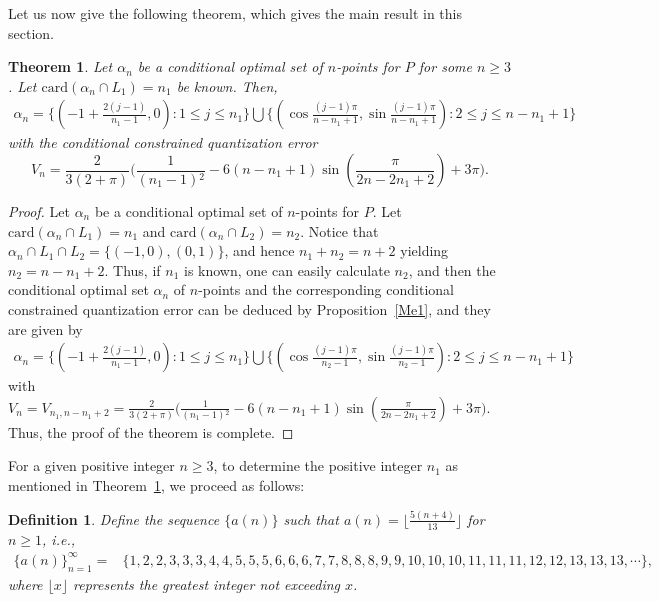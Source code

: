 \documentclass[12pt, reqno]{amsart}
\theoremstyle{plain}
\newtheorem{theo}[subsection]{Theorem}
\newtheorem{defi}[subsection]{Definition}
\theoremstyle{definition}
\newcommand{\ii}{\cap}%
\newcommand{\UU}{\bigcup}%
\newcommand{\set}[1]{\{#1\}}%
\newcommand{\ga}{\alpha}
\newcommand{\te}{\text}%
\begin{document}
Let us now give the following theorem, which gives the main result in this section. 
\begin{theo}\label{theo1}
Let $\ga_n$ be a conditional optimal set of $n$-points for $P$ for some $n\geq 3$. Let $\te{card}(\ga_n\ii L_1)=n_1$ be known. Then, 
\begin{align*}
\ga_n=\set{(-1+\frac{2(j-1)}{n_1-1}, 0) : 1\leq j\leq n_1}\UU \set{(\cos \frac{(j-1)\pi}{n-n_1+1}, \sin\frac {(j-1)\pi}{n-n_1+1}) : 2\leq j\leq n-n_1+1} 
\end{align*}
with the conditional constrained quantization error 
\[V_n=\frac{2}{3 (2+\pi )} \Big(\frac{1}{(n_1-1){}^2}-6 (n-n_1+1) \sin (\frac{\pi }{2 n-2 n_1+2})+3 \pi \Big).\]
 \end{theo}
\begin{proof}
Let $\ga_n$ be a conditional optimal set of $n$-points for $P$. Let $\te{card}(\ga_n\ii L_1)=n_1$  and $\te{card}(\ga_n\ii L_2)=n_2$. Notice that $\ga_n\ii L_1\ii L_2=\set{(-1, 0), (0, 1)}$, and hence $n_1+n_2=n+2$ yielding $n_2=n-n_1+2$. Thus, if $n_1$ is known, one can easily calculate $n_2$, and then the conditional optimal set $\ga_n$ of $n$-points and the corresponding conditional constrained quantization error can be deduced by Proposition~\ref{Me1}, and they are given by 
\begin{align*}
\ga_n=\set{(-1+\frac{2(j-1)}{n_1-1}, 0) : 1\leq j\leq n_1}\UU \set{(\cos \frac{(j-1)\pi}{n_2-1}, \sin\frac {(j-1)\pi}{n_2-1}) : 2\leq j\leq n-n_1+1} 
\end{align*} 
with $V_n=V_{n_1, n-n_1+2}=\frac{2}{3 (2+\pi )}\Big(\frac{1}{(n_1-1){}^2}-6 (n-n_1+1) \sin (\frac{\pi }{2 n-2 n_1+2})+3 \pi \Big)$.
Thus, the proof of the theorem is complete. 
\end{proof}

For a given positive integer $n\geq 3$, to determine the positive integer $n_1$ as mentioned in Theorem~\ref{theo1}, we proceed as follows: 
 
\begin{defi} \label{difi21}
Define the sequence $\set{a(n)}$ such that $a(n)=\lfloor\frac{5 (n+4)}{13}\rfloor$ for $n\geq 1$, i.e.,
\begin{align*}
 \set{a(n)}_{n=1}^\infty=&\set{1, 2, 2, 3, 3, 3, 4, 4, 5, 5, 5, 6, 6, 6, 7, 7, 8, 8, 8, 9, 9, 10, 10, 10, 11, 11, 11, 12, 12, 13, 13, 13, \cdots},
\end{align*}
where $\lfloor x\rfloor$ represents the greatest integer not exceeding $x$.
\end{defi}
\end{document}
